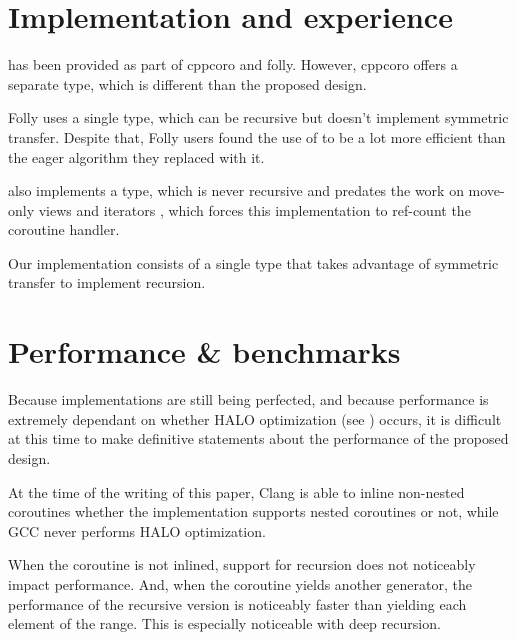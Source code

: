 \documentclass{wg21}
\begin{document}
\section{Implementation and experience}

 has been provided as part of cppcoro and folly.
However, cppcoro offers a separate  type, which is different than the proposed design.

Folly uses a single  type, which can be recursive but doesn't implement symmetric transfer. Despite that,
Folly users found the use of  to be a lot more efficient than the eager algorithm they replaced with it.

 also implements a  type, which is never recursive and predates the work on move-only views and
iterators \cite{P1456R1}, \cite{P1207R0} which forces this implementation to ref-count the coroutine handler.

Our implementation \cite{Implementation} consists of a single type that takes advantage of symmetric transfer to implement
recursion.

\section{Performance \& benchmarks}

Because implementations are still being perfected, and because performance is extremely dependant on whether HALO optimization (see )
occurs, it is difficult at this time to make definitive statements about the performance of the proposed design.

At the time of the writing of this paper, Clang is able to inline non-nested coroutines whether the implementation
supports nested coroutines or not, while GCC never performs HALO optimization.

When the coroutine is not inlined, support for recursion does not noticeably impact performance.
And, when the coroutine yields another generator, the performance of the recursive version is noticeably faster than
yielding each element of the range. This is especially noticeable with deep recursion.
\end{document}
